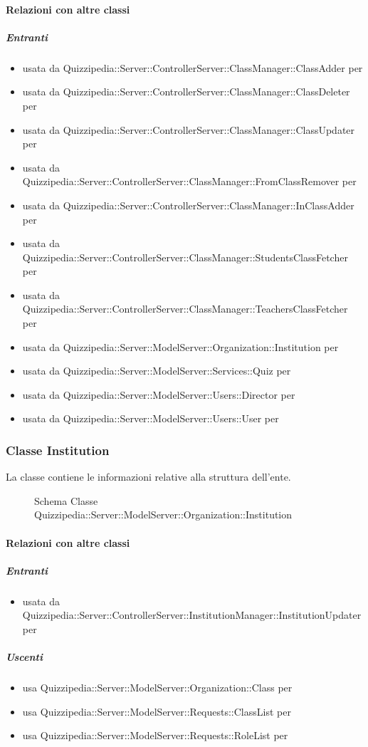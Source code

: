 \paragraph{Relazioni con altre classi}
\subparagraph{Entranti}
\begin{itemize}
\item usata da Quizzipedia::Server::ControllerServer::ClassManager::ClassAdder per 
\item usata da Quizzipedia::Server::ControllerServer::ClassManager::ClassDeleter per 
\item usata da Quizzipedia::Server::ControllerServer::ClassManager::ClassUpdater per 
\item usata da Quizzipedia::Server::ControllerServer::ClassManager::FromClassRemover per 
\item usata da Quizzipedia::Server::ControllerServer::ClassManager::InClassAdder per 
\item usata da Quizzipedia::Server::ControllerServer::ClassManager::StudentsClassFetcher per 
\item usata da Quizzipedia::Server::ControllerServer::ClassManager::TeachersClassFetcher per 
\item usata da Quizzipedia::Server::ModelServer::Organization::Institution per 
\item usata da Quizzipedia::Server::ModelServer::Services::Quiz per 
\item usata da Quizzipedia::Server::ModelServer::Users::Director per 
\item usata da Quizzipedia::Server::ModelServer::Users::User per 
\end{itemize}
\subsubsection{Classe Institution}
La classe contiene le informazioni relative alla struttura dell'ente.
\begin{figure}[H]
\centering
\noindent{}
\caption[Schema Classe Institution]{Schema Classe Quizzipedia::Server::ModelServer::Organization::Institution}
\end{figure}
\paragraph{Relazioni con altre classi}
\subparagraph{Entranti}
\begin{itemize}
\item usata da Quizzipedia::Server::ControllerServer::InstitutionManager::InstitutionUpdater per 
\end{itemize}
\subparagraph{Uscenti}
\begin{itemize}
\item usa Quizzipedia::Server::ModelServer::Organization::Class per 
\item usa Quizzipedia::Server::ModelServer::Requests::ClassList per 
\item usa Quizzipedia::Server::ModelServer::Requests::RoleList per 
\end{itemize}
